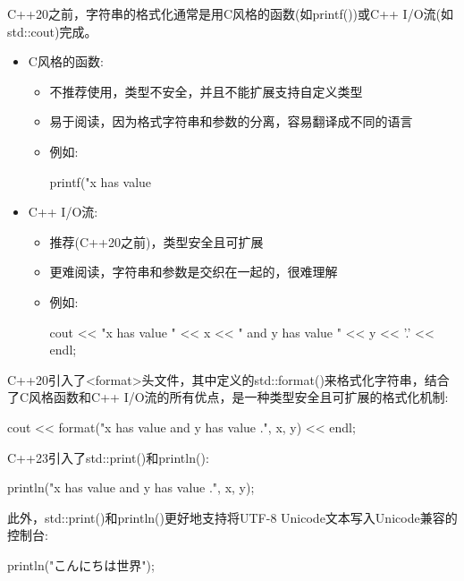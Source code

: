 
C++20之前，字符串的格式化通常是用C风格的函数(如printf())或C++ I/O流(如std::cout)完成。

\begin{itemize}
\item
C风格的函数:

\begin{itemize}
\item
不推荐使用，类型不安全，并且不能扩展支持自定义类型

\item
易于阅读，因为格式字符串和参数的分离，容易翻译成不同的语言

\item
例如:
\begin{cpp}
printf("x has value %
\end{cpp}
\end{itemize}

\item
C++ I/O流:

\begin{itemize}
\item
推荐(C++20之前)，类型安全且可扩展

\item
更难阅读，字符串和参数是交织在一起的，很难理解

\item
例如:
\begin{cpp}
cout << "x has value " << x << " and y has value " << y << '.' << endl;
\end{cpp}
\end{itemize}

\end{itemize}

C++20引入了<format>头文件，其中定义的std::format()来格式化字符串，结合了C风格函数和C++ I/O流的所有优点，是一种类型安全且可扩展的格式化机制:

\begin{cpp}
cout << format("x has value {} and y has value {}.", x, y) << endl;
\end{cpp}

C++23引入了std::print()和println():

\begin{cpp}
println("x has value {} and y has value {}.", x, y);
\end{cpp}

此外，std::print()和println()更好地支持将UTF-8 Unicode文本写入Unicode兼容的控制台:

\begin{cpp}
println("こんにちは世界");
\end{cpp}

